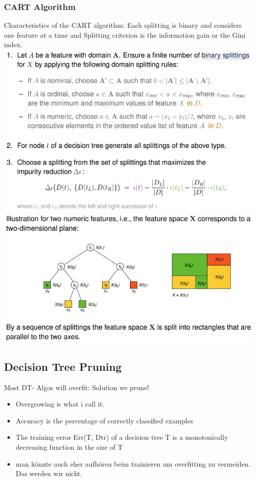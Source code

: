 \documentclass[11pt,a4paper]{article}
\begin{document}
\begin{flushleft}
\subsubsection{CART Algorithm}
Characteristics of the CART algorithm: Each splitting is binary and considers one feature at a time and  Splitting criterion is the information gain or the Gini index. 
\includegraphics[width = \textwidth]{cart}
\includegraphics[width = \textwidth]{cartTree}
\subsection{Decision Tree Pruning}
Most DT- Algos will overfit: Solution we prune!
\begin{itemize}
\item Overgrowing is what i call it.
\item Accuracy is the percentage of correctly classified examples
\item The training error Err(T, Dtr) of a decision tree T is a monotonically decreasing function in
the size of T
\item man könnte auch eher aufhören beim trainieren um overfitting zu vermeiden. Das werden wir nicht.
\end{itemize}

\end{flushleft}
\end{document}
